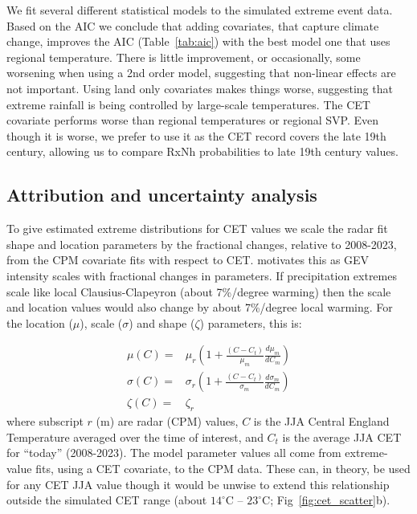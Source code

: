 \documentclass[11pt,a4paper]{article}
\begin{document}
We fit several different statistical models to the simulated  extreme event data. Based on the AIC we conclude that adding covariates, that capture climate change, improves the AIC (Table~\ref{tab:aic}) with the best model one that uses regional temperature. There is little improvement, or occasionally, some worsening when using a 2nd order model, suggesting that non-linear effects are not important. Using land only covariates makes things worse, suggesting that extreme rainfall is being controlled by large-scale temperatures.  The CET covariate performs worse than  regional  temperatures or regional SVP. Even though it is worse, we prefer to use it as the CET record covers the late 19th century, allowing us to compare RxNh probabilities to  late 19th century values.

\subsection{Attribution and uncertainty analysis}

To give estimated extreme distributions for  CET values we  scale the radar fit shape and location parameters by the fractional changes, relative to 2008-2023, from the CPM covariate fits with respect to CET.  \cite{tett2023edinburgh} motivates this as  GEV intensity scales with fractional changes in parameters\parencite{Coles_2001}. If precipitation extremes scale like local Clausius-Clapeyron (about 7\%/degree warming) then the scale and location values would also change by about 7\%/degree local warming.  For the location ($\mu$), scale ($\sigma$) and shape ($\zeta$) parameters, this is:

\begin{equation}\label{eq:gev_params}
\begin{aligned}
\mu(C) =& \mu_r \left( 1+  \frac{(C-C_t)}{\mu_m} \frac{d\mu_m}{dC_m}\right)\\
\sigma(C) =& \sigma_r\left ( 1+  \frac{(C-C_t)}{\sigma_m}  \frac{d\sigma_m}{dC_m}\right)\\
\zeta(C)=&\zeta_r
\end{aligned}
\end{equation}
where subscript $r$ (m) are radar (CPM) values, $C$ is the JJA Central England Temperature averaged over the time of interest, and $C_t$ is the average JJA CET for ``today'' (2008-2023). The model parameter values all come from extreme-value fits, using a CET covariate, to the CPM data. These can, in theory, be used for any CET JJA value though it would be unwise to extend this relationship outside the simulated CET range (about $14^\circ$C -- $23^\circ$C; Fig~\ref{fig:cet_scatter}b).   
\end{document}
